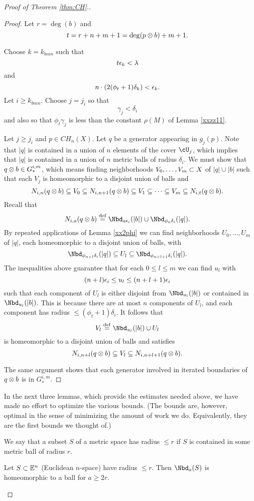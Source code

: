 {\begin{proof}[Proof of Theorem \ref{thm:CH}.]
\begin{proof}
Let $r = \deg(b)$ and 
\[
	t = r+n+m+1 = \deg(p\otimes b) + m + 1.
\]

Choose $k = k_{bmn}$ such that
\[
	t\epsilon_k < \lambda
\]
and
\[
	n\cdot (2 (\phi_t + 1) \delta_k) < \epsilon_k .
\]
Let $i \ge k_{bmn}$.
Choose $j = j_i$ so that
\[
	\gamma_j < \delta_i
\]
and also so that $\phi_t \gamma_j$ is less than the constant $\rho(M)$ of Lemma \ref{xxzz11}.

Let $j \ge j_i$ and $p\in CH_n(X)$.
Let $q$ be a generator appearing in $g_j(p)$.
Note that $|q|$ is contained in a union of $n$ elements of the cover $\cU_j$,
which implies that $|q|$ is contained in a union of $n$ metric balls of radius $\delta_i$.
We must show that $q\otimes b \in G_*^{i,m}$, which means finding neighborhoods
$V_0,\ldots,V_m \subset X$ of $|q|\cup |b|$ such that each $V_j$
is homeomorphic to a disjoint union of balls and
\[
	N_{i,n}(q\otimes b) \subseteq V_0 \subseteq N_{i,n+1}(q\otimes b)
			\subseteq V_1 \subseteq \cdots \subseteq V_m \subseteq N_{i,t}(q\otimes b) .
\]
Recall that
\[
	N_{i,a}(q\ot b) \deq \Nbd_{a\ep_i}(|b|) \cup \Nbd_{\phi_a\delta_i}(|q|).
\]
By repeated applications of Lemma \ref{xx2phi} we can find neighborhoods $U_0,\ldots,U_m$
of $|q|$, each homeomorphic to a disjoint union of balls, with
\[
	\Nbd_{\phi_{n+l} \delta_i}(|q|) \subeq U_l \subeq \Nbd_{\phi_{n+l+1} \delta_i}(|q|) .
\]
The inequalities above guarantee that 
for each $0\le l\le m$ we can find $u_l$ with 
\[
	(n+l)\epsilon_i \le u_l \le (n+l+1)\epsilon_i
\]
such that each component of $U_l$ is either disjoint from $\Nbd_{u_l}(|b|)$ or contained in 
$\Nbd_{u_l}(|b|)$.
This is because there are at most $n$ components of $U_l$, and each component
has radius $\le (\phi_t + 1) \delta_i$.
It follows that
\[
	V_l \deq \Nbd_{u_l}(|b|) \cup U_l
\]
is homeomorphic to a disjoint union of balls and satisfies
\[
	N_{i,n+l}(q\otimes b) \subseteq V_l \subseteq N_{i,n+l+1}(q\otimes b) .
\]

The same argument shows that each generator involved in iterated boundaries of $q\otimes b$
is in $G_*^{i,m}$.
\end{proof}

In the next three lemmas, which provide the estimates needed above, we have made no effort to optimize the various bounds.
(The bounds are, however, optimal in the sense of minimizing the amount of work
we do.  Equivalently, they are the first bounds we thought of.)

We say that a subset $S$ of a metric space has radius $\le r$ if $S$ is contained in
some metric ball of radius $r$.

\begin{lemma}
Let $S \subset \mathbb{E}^n$ (Euclidean $n$-space) have radius $\le r$.  
Then $\Nbd_a(S)$ is homeomorphic to a ball for $a \ge 2r$.
\end{lemma}


\end{proof}}
